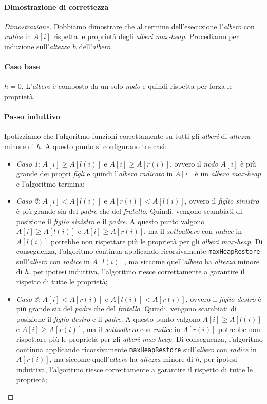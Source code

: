 \paragraph{Dimostrazione di correttezza}
\begin{proof}[Dimostrazione]
    Dobbiamo dimostrare che al termine dell'esecuzione l'\emph{albero} con
    \emph{radice} in $A[i]$ rispetta le proprietà degli \emph{alberi max-heap}.
    Procediamo per induzione sull'\emph{altezza} $h$ dell'\emph{albero}.

    \paragraph{Caso base} $h=0$. L'\emph{albero} è composto da un solo
    \emph{nodo} e quindi rispetta per forza le proprietà.
    \paragraph{Passo induttivo} Ipotizziamo che l'algoritmo funzioni correttamente
    su tutti gli \emph{alberi} di \emph{altezza} minore di $h$. A questo punto si
    configurano tre casi:
    \begin{itemize}
        \item \emph{Caso 1}: $A[i]\geq A[l(i)]$ e $A[i]\geq A[r(i)]$, ovvero
        il \emph{nodo} $A[i]$ è più grande dei propri \emph{figli} e quindi
        l'\emph{albero radicato} in $A[i]$ è un \emph{albero max-heap} e l'algoritmo
        termina;
        \item \emph{Caso 2}: $A[i]<A[l(i)]$ e $A[r(i)]<A[l(i)]$, ovvero il \emph{figlio
        sinistro} è più grande sia del \emph{padre} che del \emph{fratello}. Quindi,
        vengono scambiati di posizione il \emph{figlio sinistro} e il \emph{padre}.
        A questo punto valgono $A[i]\geq A[l(i)]$ e $A[i]\geq A[r(i)]$, ma il
        \emph{sottoalbero} con \emph{radice} in $A[l(i)]$ potrebbe non rispettare
        più le proprietà per gli \emph{alberi max-heap}. Di conseguenza, l'algoritmo
        continua applicando ricorsivamente \texttt{maxHeapRestore} sull'\emph{albero}
        con \emph{radice} in $A[l(i)]$, ma siccome quell'\emph{albero} ha \emph{altezza}
        minore di $h$, per ipotesi induttiva, l'algoritmo riesce correttamente a
        garantire il rispetto di tutte le proprietà;
        \item \emph{Caso 3}: $A[i]<A[r(i)]$ e $A[l(i)]<A[r(i)]$, ovvero il \emph{figlio
        destro} è più grande sia del \emph{padre} che del \emph{fratello}. Quindi,
        vengono scambiati di posizione il \emph{figlio destro} e il \emph{padre}.
        A questo punto valgono $A[i]\geq A[l(i)]$ e $A[i]\geq A[r(i)]$, ma il
        \emph{sottoalbero} con \emph{radice} in $A[r(i)]$ potrebbe non rispettare
        più le proprietà per gli \emph{alberi max-heap}. Di conseguenza, l'algoritmo
        continua applicando ricorsivamente \texttt{maxHeapRestore} sull'\emph{albero}
        con \emph{radice} in $A[r(i)]$, ma siccome quell'\emph{albero} ha \emph{altezza}
        minore di $h$, per ipotesi induttiva, l'algoritmo riesce correttamente a
        garantire il rispetto di tutte le proprietà;
    \end{itemize}
\end{proof}\noindent
